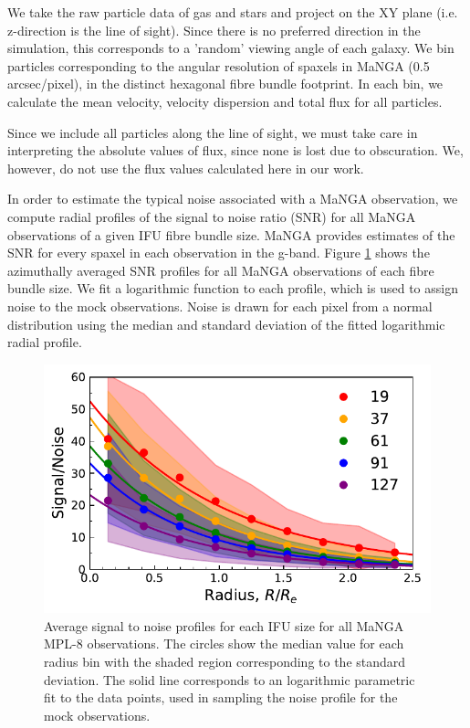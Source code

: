 \documentclass[fleqn,usenatbib]{mnras}
\begin{document}
We take the raw particle data of gas and stars and project on the XY plane (i.e. z-direction is the line of sight). Since there is no preferred direction in the simulation, this corresponds to a 'random' viewing angle of each galaxy. We bin particles corresponding to the angular resolution of spaxels in MaNGA (0.5 arcsec/pixel), in the distinct hexagonal fibre bundle footprint. In each bin, we calculate the mean velocity, velocity dispersion and total flux for all particles.

Since we include all particles along the line of sight, we must take care in interpreting the absolute values of flux, since none is lost due to obscuration. We, however, do not use the flux values calculated here in our work.

In order to estimate the typical noise associated with a MaNGA observation, we compute radial profiles of the signal to noise ratio (SNR) for all MaNGA observations of a given IFU fibre bundle size. MaNGA provides estimates of the SNR for every spaxel in each observation in the g-band. Figure \ref{fig:noise_profile} shows the azimuthally averaged SNR profiles for all MaNGA observations of each fibre bundle size. We fit a logarithmic function to each profile, which is used to assign noise to the mock observations. Noise is drawn for each pixel from a normal distribution using the median and standard deviation of the fitted logarithmic radial profile.   

\begin{figure}
	\includegraphics[width=\linewidth]{noise_profiles_ifusize.pdf}
    \caption{Average signal to noise profiles for each IFU size for all MaNGA MPL-8 observations. The circles show the median value for each radius bin with the shaded region corresponding to the standard deviation. The solid line corresponds to an logarithmic parametric fit to the data points, used in sampling the noise profile for the mock observations.}
    \label{fig:noise_profile}
\end{figure}
\end{document}
